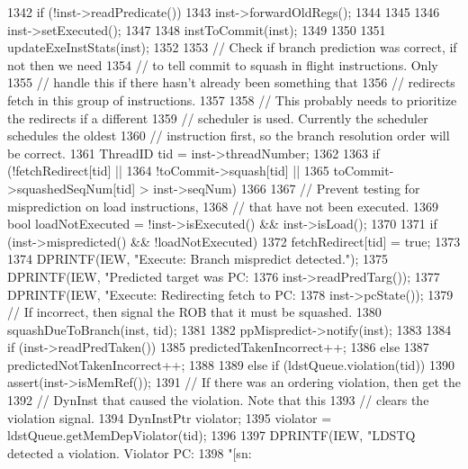 \begin{DoxyCode}
{{{{1342                 if (!inst->readPredicate())
1343                     inst->forwardOldRegs();
1344             }
1345 
1346             inst->setExecuted();
1347 
1348             instToCommit(inst);
1349         }
1350 
1351         updateExeInstStats(inst);
1352 
1353         // Check if branch prediction was correct, if not then we need
1354         // to tell commit to squash in flight instructions.  Only
1355         // handle this if there hasn't already been something that
1356         // redirects fetch in this group of instructions.
1357 
1358         // This probably needs to prioritize the redirects if a different
1359         // scheduler is used.  Currently the scheduler schedules the oldest
1360         // instruction first, so the branch resolution order will be correct.
1361         ThreadID tid = inst->threadNumber;
1362 
1363         if (!fetchRedirect[tid] ||
1364             !toCommit->squash[tid] ||
1365             toCommit->squashedSeqNum[tid] > inst->seqNum) {
1366 
1367             // Prevent testing for misprediction on load instructions,
1368             // that have not been executed.
1369             bool loadNotExecuted = !inst->isExecuted() && inst->isLoad();
1370 
1371             if (inst->mispredicted() && !loadNotExecuted) {
1372                 fetchRedirect[tid] = true;
1373 
1374                 DPRINTF(IEW, "Execute: Branch mispredict detected.\n");
1375                 DPRINTF(IEW, "Predicted target was PC: %
1376                         inst->readPredTarg());
1377                 DPRINTF(IEW, "Execute: Redirecting fetch to PC: %
1378                         inst->pcState());
1379                 // If incorrect, then signal the ROB that it must be squashed.
1380                 squashDueToBranch(inst, tid);
1381 
1382                 ppMispredict->notify(inst);
1383 
1384                 if (inst->readPredTaken()) {
1385                     predictedTakenIncorrect++;
1386                 } else {
1387                     predictedNotTakenIncorrect++;
1388                 }
1389             } else if (ldstQueue.violation(tid)) {
1390                 assert(inst->isMemRef());
1391                 // If there was an ordering violation, then get the
1392                 // DynInst that caused the violation.  Note that this
1393                 // clears the violation signal.
1394                 DynInstPtr violator;
1395                 violator = ldstQueue.getMemDepViolator(tid);
1396 
1397                 DPRINTF(IEW, "LDSTQ detected a violation. Violator PC: %
1398                         "[sn:%
}}}}
\end{DoxyCode}
